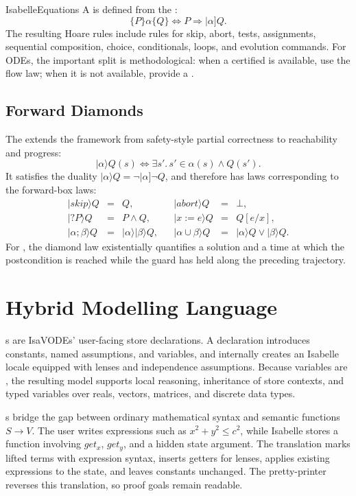 \documentclass[hidelinks]{article}
\begin{document}
\begin{smodule}[title={IsaVODEs: Interactive Verification of Cyber-Physical Systems at Scale}]{IsabelleEquations}
A  is defined from the :
\[
    \{P\}\alpha\{Q\}\Longleftrightarrow P\Longrightarrow|\alpha]Q.
\]
The resulting Hoare rules include rules for skip, abort, tests, assignments, sequential composition, choice, conditionals, loops, and evolution commands.
For ODEs, the important split is methodological: when a certified  is available, use the flow law; when it is not available, provide a .

\subsection{Forward Diamonds}

The  extends the framework from safety-style partial correctness to reachability and progress:
\[
    |\alpha\rangle Q(s) \Longleftrightarrow
    \exists s'.\, s'\in\alpha(s)\wedge Q(s').
\]
It satisfies the duality \( |\alpha\rangle Q=\neg|\alpha]\neg Q\), and therefore has laws corresponding to the forward-box laws:
\[
\begin{array}{rclcrcl}
|skip\rangle Q &=& Q, &&
|abort\rangle Q &=& \bot,\\
|?P\rangle Q &=& P\wedge Q, &&
|x:=e\rangle Q &=& Q[e/x],\\
|\alpha;\beta\rangle Q &=& |\alpha\rangle|\beta\rangle Q, &&
|\alpha\cup\beta\rangle Q &=& |\alpha\rangle Q\vee|\beta\rangle Q.
\end{array}
\]
For , the diamond law existentially quantifies a solution and a time at which the postcondition is reached while the guard has held along the preceding trajectory.

\section{Hybrid Modelling Language}

s are IsaVODEs' user-facing store declarations.
A declaration introduces constants, named assumptions, and variables, and internally creates an Isabelle locale equipped with lenses and independence assumptions.
Because variables are , the resulting model supports local reasoning, inheritance of store contexts, and typed variables over reals, vectors, matrices, and discrete data types.

s bridge the gap between ordinary mathematical syntax and semantic functions \(S\to V\).
The user writes expressions such as \(x^2+y^2\leq c^2\), while Isabelle stores a function involving \(get_x\), \(get_y\), and a hidden state argument.
The translation marks lifted terms with expression syntax, inserts getters for lenses, applies existing expressions to the state, and leaves constants unchanged.
The pretty-printer reverses this translation, so proof goals remain readable.


\end{smodule}
\end{document}
